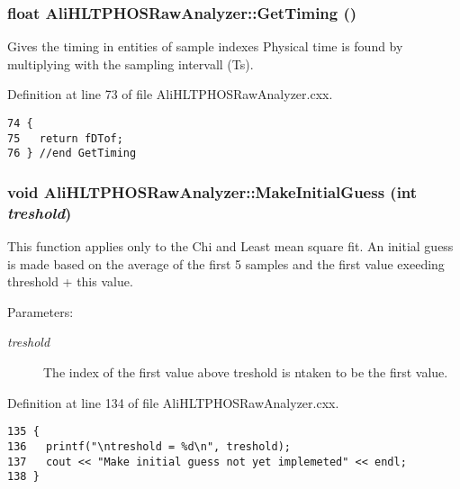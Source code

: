 \subsubsection{\setlength{\rightskip}{0pt plus 5cm}float Ali\-HLTPHOSRaw\-Analyzer::Get\-Timing ()\hspace{0.3cm}{\tt  [inherited]}}\label{classAliHLTPHOSRawAnalyzer_AliHLTPHOSRawAnalyzerPeakFindera10}


Gives the timing in entities of sample indexes Physical time is found by multiplying with the sampling intervall (Ts). 

Definition at line 73 of file Ali\-HLTPHOSRaw\-Analyzer.cxx.

\footnotesize\begin{verbatim}74 {
75   return fDTof;
76 } //end GetTiming
\end{verbatim}\normalsize 


\subsubsection{\setlength{\rightskip}{0pt plus 5cm}void Ali\-HLTPHOSRaw\-Analyzer::Make\-Initial\-Guess (int {\em treshold})\hspace{0.3cm}{\tt  [inherited]}}\label{classAliHLTPHOSRawAnalyzer_AliHLTPHOSRawAnalyzerPeakFindera15}


This function applies only to the Chi and Least mean square fit. An initial guess is made based on the average of the first 5 samples and the first value exeeding threshold + this value. \begin{Desc}
\item[Parameters:]
\begin{description}
\item[{\em treshold}]The index of the first value above treshold is ntaken to be the first value. \end{description}
\end{Desc}


Definition at line 134 of file Ali\-HLTPHOSRaw\-Analyzer.cxx.

\footnotesize\begin{verbatim}135 {
136   printf("\ntreshold = %d\n", treshold);
137   cout << "Make initial guess not yet implemeted" << endl;  
138 }
\end{verbatim}\normalsize 


